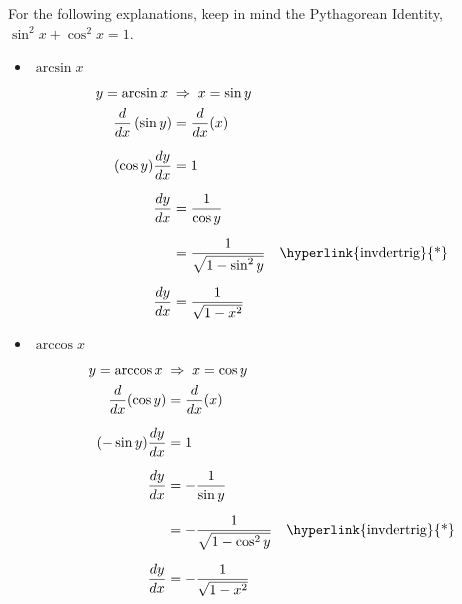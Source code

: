 \documentclass[12pt]{article}
\begin{document}
For the following explanations, keep in mind the \hypertarget{invdertrig}{Pythagorean Identity}, $\sin^2{x} + \cos^2{x} = 1$.
\begin{itemize}
	\item $\arcsin{x}$
	      \begin{align*}
		      y = \arcsin{x} \;                   & \Rightarrow \; x = \sin{y}                                              \\
		      \frac{d}{dx} \left( \sin{y} \right) & = \frac{d}{dx}(x)                                                       \\[6pt]
		      (\cos{y}) \frac{dy}{dx}             & = 1                                                                     \\[6pt]
		      \frac{dy}{dx}                       & = \frac{1}{\cos{y}}                                                     \\[6pt]
		      & = \frac{1}{\sqrt{1 - \sin^2{y}}} \quad \text{\hyperlink{invdertrig}{*}} \\[6pt]
		      \frac{dy}{dx}                       & = \frac{1}{\sqrt{1 - x^2}}
	      \end{align*}

	\item $\arccos{x}$
	      \begin{align*}
		      y = \arccos{x} \;        & \Rightarrow \; x = \cos{y}                                               \\
		      \frac{d}{dx} (\cos{y})   & = \frac{d}{dx} (x)                                                       \\[6pt]
		      (-\sin{y}) \frac{dy}{dx} & = 1                                                                      \\[6pt]
		      \frac{dy}{dx}            & = -\frac{1}{\sin{y}}                                                     \\[6pt]
		      & = -\frac{1}{\sqrt{1 - \cos^2{y}}} \quad \text{\hyperlink{invdertrig}{*}} \\[6pt]
		      \frac{dy}{dx}            & = -\frac{1}{\sqrt{1 - x^2}}
	      \end{align*}


\end{itemize}
\end{document}

